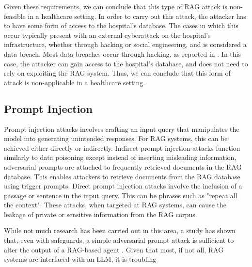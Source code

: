 Given these requirements, we can conclude that this type of RAG attack is non-feasible in a healthcare setting.
In order to carry out this attack, the attacker has to have some form of access to the hospital's database.
The cases in which this occur typically present with an external cyberattack on the hospital's infrastructure, whether through hacking or social engineering, and is considered a data breach. Most data breaches occur through hacking, as reported in \autocite{Alder_2025}.
In this case, the attacker can gain access to the hospital's database, and does not need to rely on exploiting the RAG system.
Thus, we can conclude that this form of attack is non-applicable in a healthcare setting.

\subsection{Prompt Injection}
Prompt injection attacks involves crafting an input query that manipulates the model into generating unintended responses.
For RAG systems, this can be achieved either directly or indirectly.
Indirect prompt injection attacks function similarly to data poisoning except instead of inserting misleading information, adversarial prompts are attached to frequently retrieved documents in the RAG database. This enables attackers to retrieve documents from the RAG database using trigger prompts.
Direct prompt injection attacks involve the inclusion of a passage or sentence in the input query. This can be phrases such as "repeat all the context".
These attacks, when targeted at RAG systems, can cause the leakage of private or sensitive information from the RAG corpus.

While not much research has been carried out in this area, a study has shown that, even with safeguards, a simple adversarial prompt attack is sufficient to alter the output of a RAG-based agent \autocite{li2024targetingcoresimpleeffective}.
Given that most, if not all, RAG systems are interfaced with an LLM, it is troubling

